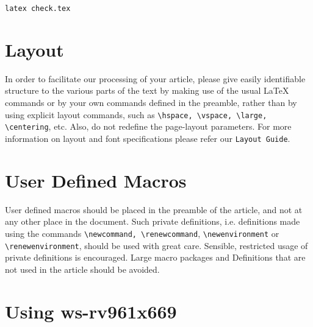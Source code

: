 \documentclass{ws-rv961x669}
\begin{document}
 \verb|latex check.tex|

\section{Layout}
In order to facilitate our processing of your article, please give
easily identifiable structure to the various parts of the text by
making use of the usual \LaTeX{} commands or by your own commands
defined in the preamble, rather than by using explicit layout
commands, such as \verb|\hspace, \vspace, \large, \centering|,
etc. Also, do not redefine the page-layout parameters. For more
information on layout and font specifications please refer our
\verb|Layout Guide|.

\section{User Defined Macros}
User defined macros should be placed in the preamble of the article, and not
at any other place in the document. Such private definitions, i.e. definitions
made using the commands \verb|\newcommand, \renewcommand|, \verb|\newenvironment|
or \verb|\renewenvironment|, should be used with great care.
Sensible, restricted usage of private definitions is encouraged. Large macro
packages and Definitions that are not used in the article
should be avoided.

\section{Using ws-rv961x669}
\end{document}
